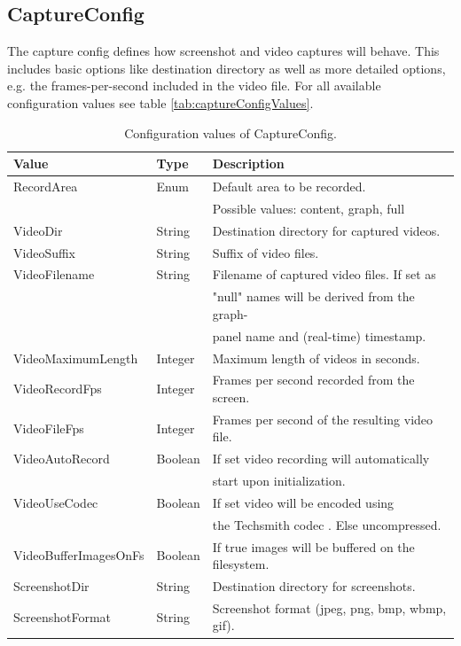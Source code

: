 \subsection{CaptureConfig}
\label{ss:captureConfig}
The capture config defines how screenshot and video captures will behave. This includes basic options like destination directory as well as more detailed options, e.g. the frames-per-second included in the video file. For all available configuration values see table \ref{tab:captureConfigValues}.

\begin{table}[h]
\caption{Configuration values of CaptureConfig.}
\centering
\begin{tabular}[h]{|l|l|l|}\hline
	\textbf{Value} & \textbf{Type} & \textbf{Description}\\
	\hline
	RecordArea & Enum & Default area to be recorded.\\
	& & Possible values: content, graph, full\\
	\hline
	VideoDir & String & Destination directory for captured videos.\\
	\hline
	VideoSuffix & String & Suffix of video files.\\
	\hline
	VideoFilename & String & Filename of captured video files. If set as\\
	& & "null" names will be derived from the graph-\\
	& & panel name and (real-time) timestamp.\\
	\hline
	VideoMaximumLength & Integer & Maximum length of videos in seconds.\\
	\hline
	VideoRecordFps & Integer & Frames per second recorded from the screen.\\
	\hline
	VideoFileFps & Integer & Frames per second of the resulting video file.\\
	\hline
	VideoAutoRecord & Boolean & If set video recording will automatically\\
	& & start upon initialization.\\
	\hline
	VideoUseCodec & Boolean & If set video will be encoded using\\
	& & the Techsmith codec \cite{techsmith-codecs}. Else uncompressed.\\
	\hline
	VideoBufferImagesOnFs & Boolean & If true images will be buffered on the filesystem.\\
	\hline
	ScreenshotDir & String & Destination directory for screenshots.\\
	\hline
	ScreenshotFormat & String & Screenshot format (jpeg, png, bmp, wbmp, gif).\\

\end{tabular}
\end{table}
